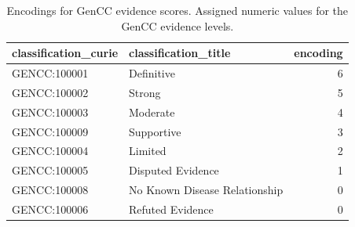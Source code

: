 \documentclass[
]{agujournal2019}
\begin{document}
\begin{longtable}[]{@{}llr@{}}

\caption{\label{tbl-gencc}Encodings for GenCC evidence scores. Assigned
numeric values for the GenCC evidence levels.}

\tabularnewline

\toprule\noalign{}
classification\_curie & classification\_title & encoding \\
\midrule\noalign{}
\endhead
\bottomrule\noalign{}
\endlastfoot
GENCC:100001 & Definitive & 6 \\
GENCC:100002 & Strong & 5 \\
GENCC:100003 & Moderate & 4 \\
GENCC:100009 & Supportive & 3 \\
GENCC:100004 & Limited & 2 \\
GENCC:100005 & Disputed Evidence & 1 \\
GENCC:100008 & No Known Disease Relationship & 0 \\
GENCC:100006 & Refuted Evidence & 0 \\

\end{longtable}

\newpage{}
\end{document}
